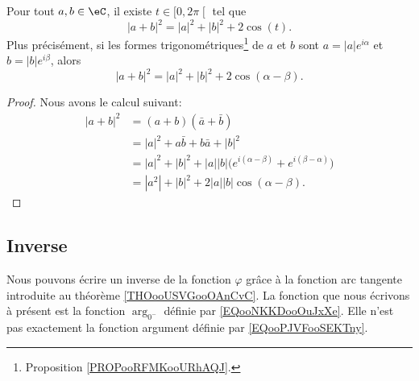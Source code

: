 \begin{lemma}        \label{LEMooOQKNooGZlJHf}
    Pour tout \( a,b\in \eC\), il existe \( t\in \mathopen[ 0 , 2\pi \mathclose[\) tel que
    \begin{equation}
        | a+b |^2=| a |^2+| b |^2+2\cos(t).
    \end{equation}
    Plus précisément, si les formes trigonométriques\footnote{Proposition \ref{PROPooRFMKooURhAQJ}.} de \( a\) et \( b\) sont \( a=| a | e^{i\alpha}\) et \( b=| b | e^{i\beta}\), alors
    \begin{equation}
        | a+b |^2=| a |^2+| b |^2+2\cos(\alpha-\beta).
    \end{equation}
\end{lemma}

\begin{proof}
    Nous avons le calcul suivant:
    \begin{subequations}
        \begin{align}
            | a+b |^2&=(a+b)(\bar a+\bar b)\\
            &=| a |^2+a\bar b+b\bar a+| b |^2\\
            &=| a |^2+| b |^2+| a | |b |\big(  e^{i(\alpha-\beta)}+ e^{i(\beta-\alpha)} \big)\\
            &=| a^2 |+| b |^2+2| a | |b |\cos(\alpha-\beta).
        \end{align}
    \end{subequations}
\end{proof}


\subsection{Inverse}
\label{SUBSECooWFNMooOuZBRN}

Nous pouvons écrire un inverse de la fonction \( \varphi\) grâce à la fonction arc tangente introduite au théorème \ref{THOooUSVGooOAnCvC}.
La fonction que nous écrivons à présent est la fonction \( \arg_{0^{-}} \) définie par \eqref{EQooNKKDooOuJxXe}. Elle n'est pas exactement la fonction argument définie par \eqref{EQooPJVFooSEKTny}.

